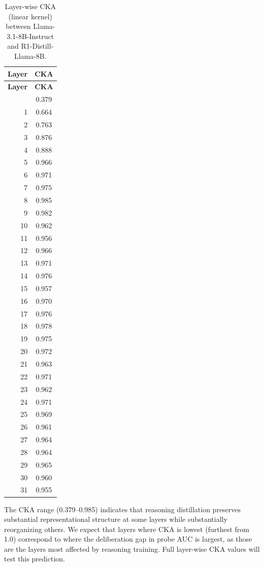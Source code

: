 \documentclass[accepted]{article}
\begin{document}
\begin{longtable}{rc}
\caption{Layer-wise CKA (linear kernel) between Llama-3.1-8B-Instruct
  and R1-Distill-Llama-8B.}
\label{tab:cka_layers} \\
\toprule
\textbf{Layer} & \textbf{CKA} \\
\midrule
\endfirsthead
\toprule
\textbf{Layer} & \textbf{CKA} \\
\midrule
\endhead
\bottomrule
\endfoot
 0 & 0.379 \\
 1 & 0.664 \\
 2 & 0.763 \\
 3 & 0.876 \\
 4 & 0.888 \\
 5 & 0.966 \\
 6 & 0.971 \\
 7 & 0.975 \\
 8 & 0.985 \\
 9 & 0.982 \\
10 & 0.962 \\
11 & 0.956 \\
12 & 0.966 \\
13 & 0.971 \\
14 & 0.976 \\
15 & 0.957 \\
16 & 0.970 \\
17 & 0.976 \\
18 & 0.978 \\
19 & 0.975 \\
20 & 0.972 \\
21 & 0.963 \\
22 & 0.971 \\
23 & 0.962 \\
24 & 0.971 \\
25 & 0.969 \\
26 & 0.961 \\
27 & 0.964 \\
28 & 0.964 \\
29 & 0.965 \\
30 & 0.960 \\
31 & 0.955 \\
\end{longtable}

\noindent The CKA range (0.379--0.985) indicates that
reasoning distillation preserves substantial representational structure
at some layers while substantially reorganizing others.  We expect
that layers where CKA is lowest (furthest from 1.0) correspond to
where the deliberation gap in probe AUC is largest, as those are the
layers most affected by reasoning training.  Full layer-wise CKA
values will test this prediction.
\end{document}
